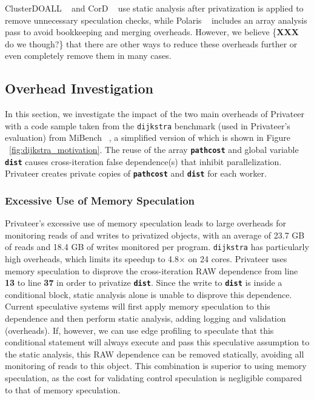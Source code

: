ClusterDOALL ~\cite{kim:12:cgo} and CorD ~\cite{ctian:2008:micro} use
static analysis after privatization is applied to remove unnecessary
speculation checks, while Polaris ~\cite{tu:94:lcpc} includes an array
analysis pass to avoid bookkeeping and merging overheads. However, we
believe \{\textbf{XXX} do we though?\} that there are other ways to reduce
these overheads further or even completely remove them in many cases.

\subsection{Overhead Investigation}
In this section, we investigate the impact of the two main overheads of
Privateer with a code sample taken from the \texttt{dijkstra} benchmark
(used in Privateer's evaluation) from MiBench ~\cite{}, a simplified
version of which is shown in Figure ~\ref{fig:dijkstra_motivation}.
The reuse of the array \texttt{\textbf{pathcost}} and global variable
\texttt{\textbf{dist}} causes cross-iteration false dependence(s) that
inhibit parallelization. Privateer creates private copies of
\texttt{\textbf{pathcost}} and \texttt{\textbf{dist}} for each worker.

\subsubsection{Excessive Use of Memory Speculation}
Privateer's excessive use of memory speculation leads to large overheads
for monitoring reads of and writes to privatized objects, with an average
of 23.7 GB of reads and 18.4 GB of writes monitored per program.
\texttt{dijkstra} has particularly high overheads, which limits its speedup
to 4.8$\times$ on 24 cores.
Privateer uses memory speculation to disprove the cross-iteration RAW
dependence from line \textbf{13} to line \textbf{37} in order to privatize
\texttt{\textbf{dist}}. Since the write to \texttt{\textbf{dist}} is inside
a conditional block, static analysis alone is unable to disprove this
dependence. Current speculative systems will first apply memory speculation
to this dependence and then perform static analysis, adding logging and
validation (overheads). If, however, we can use edge profiling to speculate
that this conditional statement will always execute and pass this
speculative assumption to the static analysis, this RAW dependence can be
removed statically, avoiding all monitoring of reads to this object. This
combination is superior to using memory speculation, as the cost for
validating control speculation is negligible compared to that of memory
speculation.

